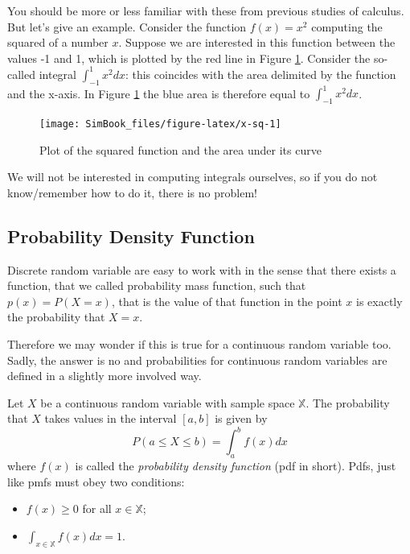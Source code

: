 \documentclass[
]{book}
\begin{document}
You should be more or less familiar with these from previous studies of calculus. But let's give an example. Consider the function \(f(x)=x^2\) computing the squared of a number \(x\). Suppose we are interested in this function between the values -1 and 1, which is plotted by the red line in Figure \ref{fig:x-sq}. Consider the so-called integral \(\int_{-1}^{1}x^2dx\): this coincides with the area delimited by the function and the x-axis. In Figure \ref{fig:x-sq} the blue area is therefore equal to \(\int_{-1}^{1}x^2dx\).

\begin{figure}

{\centering \texttt{[image: SimBook\_files/figure-latex/x-sq-1]} 

}

\caption{Plot of the squared function and the area under its curve}\label{fig:x-sq}
\end{figure}

We will not be interested in computing integrals ourselves, so if you do not know/remember how to do it, there is no problem!

\hypertarget{probability-density-function}{%
\subsection{Probability Density Function}\label{probability-density-function}}

Discrete random variable are easy to work with in the sense that there exists a function, that we called probability mass function, such that \(p(x)=P(X=x)\), that is the value of that function in the point \(x\) is exactly the probability that \(X=x\).

Therefore we may wonder if this is true for a continuous random variable too. Sadly, the answer is no and probabilities for continuous random variables are defined in a slightly more involved way.

Let \(X\) be a continuous random variable with sample space \(\mathbb{X}\). The probability that \(X\) takes values in the interval \([a,b]\) is given by
\[
P(a\leq X \leq b) = \int_{a}^bf(x)dx
\]
where \(f(x)\) is called the \emph{probability density function} (pdf in short). Pdfs, just like pmfs must obey two conditions:

\begin{itemize}
\item
  \(f(x)\geq 0\) for all \(x\in\mathbb{X}\);
\item
  \(\int_{x\in\mathbb{X}}f(x)dx=1\).
\end{itemize}
\end{document}
